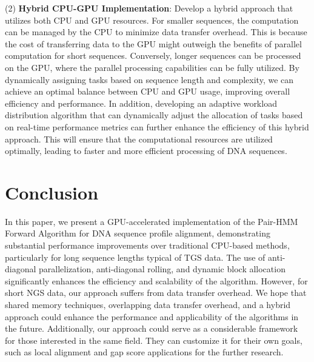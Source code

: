 \documentclass[PhD]{PHlab-thesis}
\begin{document}
(2) \textbf{Hybrid CPU-GPU Implementation}: Develop a hybrid approach that utilizes both CPU and GPU resources. For smaller sequences, the computation can be managed by the CPU to minimize data transfer overhead. This is because the cost of transferring data to the GPU might outweigh the benefits of parallel computation for short sequences. Conversely, longer sequences can be processed on the GPU, where the parallel processing capabilities can be fully utilized. By dynamically assigning tasks based on sequence length and complexity, we can achieve an optimal balance between CPU and GPU usage, improving overall efficiency and performance. In addition, developing an adaptive workload distribution algorithm that can dynamically adjust the allocation of tasks based on real-time performance metrics can further enhance the efficiency of this hybrid approach. This will ensure that the computational resources are utilized optimally, leading to faster and more efficient processing of DNA sequences.

\chapter{Conclusion}
In this paper, we present a GPU-accelerated implementation of the Pair-HMM Forward Algorithm for DNA sequence profile alignment, demonstrating substantial performance improvements over traditional CPU-based methods, particularly for long sequence lengths typical of TGS data. The use of anti-diagonal parallelization, anti-diagonal rolling, and dynamic block allocation significantly enhances the efficiency and scalability of the algorithm. However, for short NGS data, our approach suffers from data transfer overhead. We hope that shared memory techniques, overlapping data transfer overhead, and a hybrid approach could enhance the performance and applicability of the algorithms in the future. Additionally, our approach could serve as a considerable framework for those interested in the same field. They can customize it for their own goals, such as local alignment and gap score applications for the further research.
\newpage
{}
\printbibliography
\end{document}

